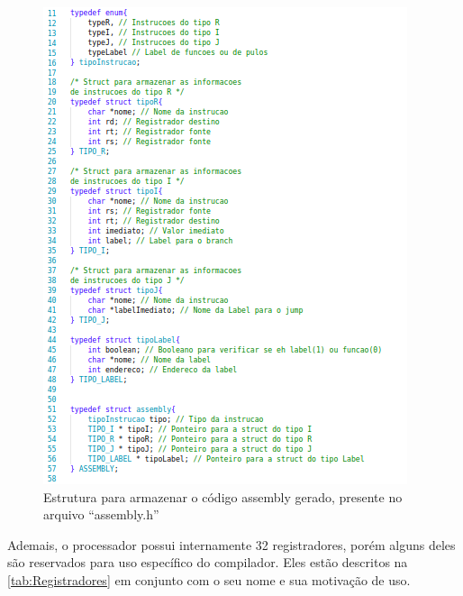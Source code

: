 \documentclass[
	12pt,				%
	oneside,
	a4paper,			%
	english,			%
	french,				%
	spanish,			%
	brazil,				%
	]{abntex2}
\begin{document}
\begin{figure}[htb]
\centering 
\caption{Estrutura para armazenar o código assembly gerado, presente no arquivo \nohyphens{``assembly.h''}} 
\label{fig:StructsCodAssembly}
\graphicspath{ {./imgs/} } 
\includegraphics[scale=0.4]{imgs/Codigo/Struct_Codigo_Assembly.png}
\end{figure}

Ademais, o processador possui internamente 32 registradores, porém alguns deles são reservados para uso específico do compilador. Eles estão descritos na \autoref{tab:Registradores} em conjunto com o seu nome e sua motivação de uso.
\end{document}
